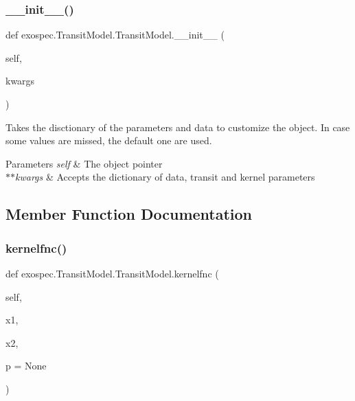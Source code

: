 \subsubsection{\texorpdfstring{\+\_\+\+\_\+init\+\_\+\+\_\+()}{\_\_init\_\_()}}
{\footnotesize\ttfamily def exospec.\+Transit\+Model.\+Transit\+Model.\+\_\+\+\_\+init\+\_\+\+\_\+ (\begin{DoxyParamCaption}\item[{}]{self,  }\item[{}]{kwargs }\end{DoxyParamCaption})}

Takes the disctionary of the parameters and data to customize the object. In case some values are missed, the default one are used. 
\begin{DoxyParams}{Parameters}
{\em self} & The object pointer \\
\hline
{\em $\ast$$\ast$kwargs} & Accepts the dictionary of data, transit and kernel parameters \\
\hline
\end{DoxyParams}


\subsection{Member Function Documentation}
\mbox{\label{classexospec_1_1_transit_model_1_1_transit_model_a4e41db96fc3b1b134bfce74aad263b50}} 
\subsubsection{\texorpdfstring{kernelfnc()}{kernelfnc()}}
{\footnotesize\ttfamily def exospec.\+Transit\+Model.\+Transit\+Model.\+kernelfnc (\begin{DoxyParamCaption}\item[{}]{self,  }\item[{}]{x1,  }\item[{}]{x2,  }\item[{}]{p = {\ttfamily None} }\end{DoxyParamCaption})}


